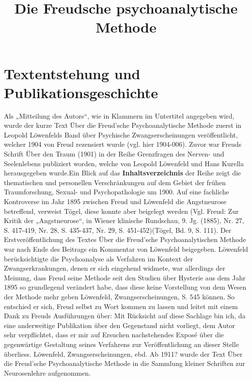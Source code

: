 \documentclass[twoside=true,titlepage=false,open=any, parskip=never, fontsize=10pt, headings=small, chapterprefix=false, appendixprefix=false]{scrbook}
\begin{document}
        \title{Die Freudsche psychoanalytische Methode}
        
        \beginnumbering
        
            \section{Textentstehung und Publikationsgeschichte}
             Als „Mitteilung des Autors“, wie in Klammern im Untertitel angegeben wird, wurde
                  der kurze Text Über die Freud’sche
                     Psychoanalytische Methode zuerst in 
                     Leopold Löwenfelds Band über Psychische Zwangserscheinungen veröffentlicht, welcher 1904 von Freud rezensiert wurde (vgl. hier 1904-006). Zuvor war Freuds
                  Schrift Über den Traum (1901) in
                  der Reihe Grenzfragen des Nerven- und Seelenlebens
                  publiziert worden, welche von Leopold Löwenfeld und Hans Kurella herausgegeben wurde.Ein Blick auf das
                     \textbf{Inhaltsverzeichnis} der Reihe zeigt die thematischen und
                  personellen Verschränkungen auf dem Gebiet der frühen Traumforschung, Sexual- und
                  Psychopathologie um 1900. Auf eine fachliche Kontroverse
                  im Jahr 1895 zwischen Freud und Löwenfeld die
                  Angstneurose betreffend, verweist Tögel, diese konnte aber beigelegt werden (Vgl.
                  Freud: Zur Kritik der „Angstneurose“,
                  in Wiener klinische Rundschau, 9. Jg. (1885), Nr. 27, S. 417-419, Nr. 28, S.
                  435-437, Nr. 29, S. 451-452)(Tögel, Bd. 9,
                     S. 111). Der Erstveröffentlichung des Textes Über die Freud’sche Psychoanalytischen Methode
                  war nach Ende des Beitrags ein Kommentar von Löwenfeld beigegeben. Löwenfeld
                  berücksichtigte die Psychoanalyse als Verfahren im Kontext der Zwangserkrankungen,
                  denen er sich eingehend widmete, war allerdings der Meinung, dass Freud seine
                  Methode seit den Studien über Hysterie aus dem Jahr 1895
                  so grundlegend verändert habe, dass diese keine Vorstellung von dem Wesen
                     der Methode mehr geben
                  Löwenfeld, Zwangserscheinungen, S. 545
                  können. So entschied er sich, Freud selbst zu Wort kommen zu lassen und leitet mit
                  einem Dank zu Freuds Ausführungen über: Mit Rücksicht auf diese Sachlage
                     bin ich, da eine anderweitige Publikation über den Gegenstand nicht vorliegt,
                     dem Autor sehr verpflichtet, dass er mir auf Ersuchen nachstehendes Exposé über
                     die gegenwärtige Gestaltung seines Verfahrens zur Veröffentlichung an dieser
                     Stelle überliess.
                  Löwenfeld, Zwangserscheinungen, ebd. Ab 1911? wurde der Text Über die Freud’sche Psychoanalytische Methode in die Sammlung kleiner
                     Schriften zur Neurosenlehre aufgenommen. 
        \beforeeledchapter
    
\end{document}

